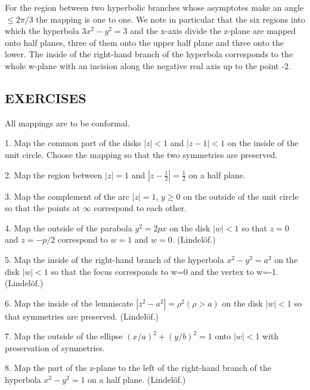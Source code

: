 For the region between two hyperbolic branches whose asymptotes make an angle $\leq 2\pi/3$ the mapping is one to one. We note in particular that the six regions into which the hyperbola $3x^{2} - y^{2} = 3$ and the x-axis divide the z-plane are mapped onto half planes, three of them onto the upper half plane and three onto the lower. The inside of the right-hand branch of the hyperbola corresponds to the whole w-plane with an incision along the negative real axis up to the point -2.

\subsection*{EXERCISES}
All mappings are to be conformal.

1. Map the common part of the disks $|z| < 1$ and $|z - 1| < 1$ on the inside of the unit circle. Choose the mapping so that the two symmetries are preserved.

2. Map the region between $|z| = 1$ and $|z - \frac{1}{2}| = \frac{1}{2}$ on a half plane.


3. Map the complement of the arc $|z| = 1$, $y \geq 0$ on the outside of the unit circle so that the points at $\infty$ correspond to each other.

4. Map the outside of the parabola $y^2 = 2px$ on the disk $|w| < 1$ so that $z = 0$ and $z = -p/2$ correspond to $w = 1$ and $w = 0$. (Lindelöf.)

5. Map the inside of the right-hand branch of the hyperbola $x^{2}-y^{2}=a^{2}$ on the disk $|w|<1$ so that the focus corresponds to w=0 and the vertex to w=-1. (Lindelöf.)

6. Map the inside of the lemniscate $|z^{2}-a^{2}|=\rho^{2}(\rho>a)$ on the disk $|w|<1$ so that symmetries are preserved. (Lindelöf.)

7. Map the outside of the ellipse $(x/a)^{2} + (y/b)^{2} = 1$ onto $|w| < 1$ with preservation of symmetries.

8. Map the part of the z-plane to the left of the right-hand branch of the hyperbola $x^{2} - y^{2} = 1$ on a half plane. (Lindelöf.)

